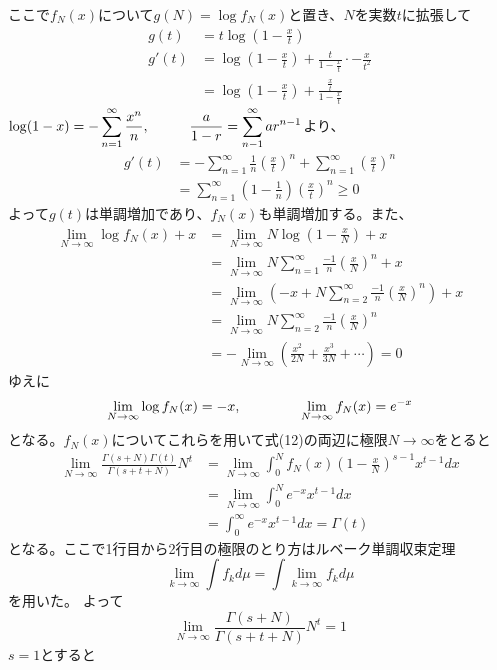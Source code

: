 \documentclass{jsarticle}
\begin{document}
ここで\(f_{N}(x)\)について\(g(N)=\log f_{N}(x)\)と置き、\(N\)を実数\(t\)に拡張して
\begin{align*}
g(t)&=t\log\left(1-\frac{x}{t}\right)\\
g'(t)&=\log\left(1-\frac{x}{t}\right)+\frac{t}{1-\frac{x}{t}}\cdot-\frac{x}{t^2}\\
&=\log\left(1-\frac{x}{t}\right)+\frac{\frac{x}{t}}{1-\frac{x}{t}}
\end{align*}
\(\displaystyle\log(1-x)=-\sum_{n=1}^{\infty}\frac{x^{n}}{n},\hspace{10mm}\frac{a}{1-r}=\sum_{n-1}^{\infty}ar^{n-1}\)より、
\begin{align*}
g'(t)&=-\sum_{n=1}^{\infty}\frac{1}{n}\left(\frac{x}{t}\right)^{n}+\sum_{n=1}^{\infty}\left(\frac{x}{t}\right)^{n}\\
&=\sum_{n=1}^{\infty}\left(1-\frac{1}{n}\right)\left(\frac{x}{t}\right)^{n}\geq0
\end{align*}
よって\(g(t)\)は単調増加であり、\(f_{N}(x)\)も単調増加する。また、
\begin{align*}
\lim_{N\to\infty}\log f_{N}(x)+x&=\lim_{N\to\infty}N\log\left(1-\frac{x}{N}\right)+x\\
&=\lim_{N\to\infty}N\sum_{n=1}^{\infty}\frac{-1}{n}\left(\frac{x}{N}\right)^{n}+x\\
&=\lim_{N\to\infty}\left(-x+N\sum_{n=2}^{\infty}\frac{-1}{n}\left(\frac{x}{N}\right)^{n}\right)+x\\
&=\lim_{N\to\infty}N\sum_{n=2}^{\infty}\frac{-1}{n}\left(\frac{x}{N}\right)^{n}\\
&=-\lim_{N\to\infty}\left(\frac{x^2}{2N}+\frac{x^3}{3N}+\cdots\right)=0
\end{align*}
ゆえに
\[\lim_{N\to\infty}\log f_{N}(x)=-x,\hspace{15mm}\lim_{N\to\infty}f_{N}(x)=e^{-x}\]
となる。\(f_{N}(x)\)についてこれらを用いて式(12)の両辺に極限\(N\to\infty\)をとると
\begin{align*}
\lim_{N\to\infty}\frac{\Gamma(s+N)\Gamma(t)}{\Gamma(s+t+N)}N^t&=\lim_{N\to\infty}\int_{0}^{N}f_{N}(x)\left(1-\frac{x}{N}\right)^{s-1}x^{t-1}dx\\
&=\lim_{N\to\infty}\int_{0}^{N}e^{-x}x^{t-1}dx\\
&=\int_{0}^{\infty}e^{-x}x^{t-1}dx=\Gamma(t)
\end{align*}
となる。ここで1行目から2行目の極限のとり方はルベーク単調収束定理
\[\lim_{k\to\infty}\int f_{k}d\mu=\int\lim_{k\to\infty}f_{k}d\mu\]
を用いた。
よって
\[\lim_{N\to\infty}\frac{\Gamma(s+N)}{\Gamma(s+t+N)}N^{t}=1\]
\(s=1\)とすると
\end{document}
